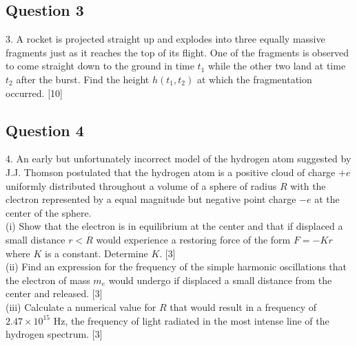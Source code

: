 \documentclass{article}
\begin{document}
\subsection{Question 3}
3. A rocket is projected straight up and explodes into three equally massive fragments just as it reaches the top of its flight. One of the fragments is observed to come straight down to the ground in time $t_{1}$ while the other two land at time $t_{2}$ after the burst. Find the height $h\left(t_{1}, t_{2}\right)$ at which the fragmentation occurred. [10]

\subsection{Question 4}
4. An early but unfortunately incorrect model of the hydrogen atom suggested by J.J. Thomson postulated that the hydrogen atom is a positive cloud of charge $+e$ uniformly distributed throughout a volume of a sphere of radius $R$ with the clectron represented by a equal magnitude but negative point charge $-e$ at the center of the sphere.  \\
(i) Show that the electron is in equilibrium at the center and that if displaced a small distance $r<R$ would experience a restoring force of the form $F=-K r$ where $K$ is a constant. Determine $K$. [3] \\
(ii) Find an expression for the frequency of the simple harmonic oscillations that the electron of mass $m_{e}$ would undergo if displaced a small distance from the center and released. [3] \\
(iii) Calculate a numerical value for $R$ that would result in a frequency of $2.47 \times 10^{15}$ $\mathrm{Hz}$, the frequency of light radiated in the most intense line of the hydrogen spectrum. [3]
\end{document}

